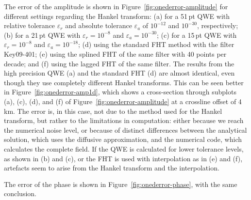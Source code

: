 \documentclass[manuscript]{geophysics}
\begin{document}
The error of the amplitude is shown in Figure~\ref{fig:onederror-amplitude} for
different settings regarding the Hankel transform: (a) for a 51\,pt QWE with
relative tolerance $\varepsilon_r$ and absolute tolerance $\varepsilon_a$ of
$10^{-12}$ and $10^{-30}$, respectively; (b) for a 21\,pt QWE with
$\varepsilon_r = 10^{-8}$ and $\varepsilon_a = 10^{-30}$; (c) for a 15\,pt QWE
with $\varepsilon_r = 10^{-8}$ and $\varepsilon_a = 10^{-18}$; (d) using the
standard FHT method with the filter Key09-401; (e) using the splined FHT of the
same filter with 40 points per decade; and (f) using the lagged FHT of the same
filter.
%
%
The results from the high precision QWE (a) and the standard FHT (d) are almost
identical, even though they use completely different Hankel transforms. This
can be seen better in Figure~\ref{fig:onederror-amp1d}, which shows a
cross-section through subplots (a), (c), (d), and (f) of
Figure~\ref{fig:onederror-amplitude} at a crossline offset of 4\,km.
%
%
The error is, in this case, not due to the method used for the Hankel transform,
but rather to the limitations in computation: either because we reach the
numerical noise level, or because of distinct differences between the
analytical solution, which uses the diffusive approximation, and the numerical
code, which calculates the complete field. If the QWE is calculated for lower
tolerance levels, as shown in (b) and (c), or the FHT is used with
interpolation as in (e) and (f), artefacts seem to arise from the Hankel
transform and the interpolation.

The error of the phase is shown in Figure~\ref{fig:onederror-phase}, with the
same conclusion.
%
%
\end{document}
